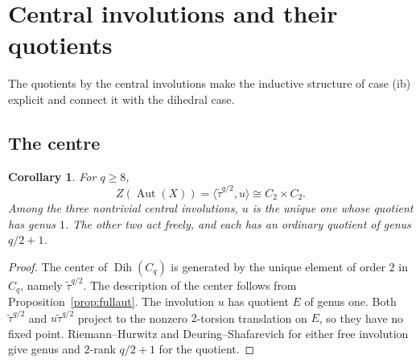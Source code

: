 \documentclass[11pt]{article}
\newtheorem{corollary}[theorem]{Corollary}
\theoremstyle{remark}
\newcommand{\Aut}{\operatorname{Aut}}
\newcommand{\Dih}{\operatorname{Dih}}
\begin{document}
\section{Central involutions and their quotients}\label{sec:KR}

The quotients by the central involutions make the inductive structure of
case \textup{(ib)} explicit and connect it with the dihedral case.

\subsection{The centre}

\begin{corollary}\label{cor:center}
For $q\ge8$,
\[
 Z(\Aut(X))=\langle\widetilde\tau^{q/2},u\rangle\cong C_2\times C_2.
\]
Among the three nontrivial central involutions, $u$ is the unique one
whose quotient has genus $1$.  The other two act freely, and each has an
ordinary quotient of genus $q/2+1$.
\end{corollary}

\begin{proof}
The center of $\Dih(C_q)$ is generated by the unique element of order
$2$ in $C_q$, namely $\widetilde\tau^{q/2}$.  The description of the
center follows from Proposition~\ref{prop:fullaut}.  The involution $u$ has quotient
$E$ of genus one.  Both $\widetilde\tau^{q/2}$ and
$u\widetilde\tau^{q/2}$ project to the nonzero $2$-torsion translation
on $E$, so they have no fixed point.  Riemann--Hurwitz and
Deuring--Shafarevich for either free involution give genus and $2$-rank
$q/2+1$ for the quotient.
\end{proof}
\end{document}
